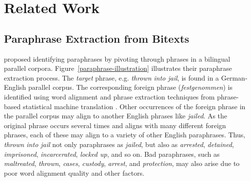 \documentclass[11pt]{article}
\begin{document}


%


\section{Related Work}

\subsection{Paraphrase Extraction from Bitexts}

  proposed identifying paraphrases by pivoting through phrases in a bilingual parallel corpora. 
Figure~\ref{paraphrase-illustration} illustrates their paraphrase extraction process. The \emph{target} phrase, e.g. {\it thrown into jail}, is found in a German-English parallel corpus.  The corresponding foreign phrase ({\it festgenommen}) is identified using word alignment and phrase extraction techniques from phrase-based statistical machine translation \cite{KoehnEtAl03}.  Other occurrences of the foreign phrase in the parallel corpus may align to another English phrases like {\it jailed}.  
%
As the original phrase occurs several times and aligns with many different foreign phrases, each of these may align to a variety of other English paraphrases.  Thus, {\it thrown into jail} not only paraphrases as {\it jailed}, but also as {\it arrested}, {\it detained}, {\it imprisoned}, {\it incarcerated}, {\it locked up}, and so on.
Bad paraphrases, such as
 {\it maltreated}, {\it thrown}, {\it cases}, {\it custody}, {\it arrest}, and {\it protection}, may also arise due to poor word alignment quality and other factors.
\end{document}
